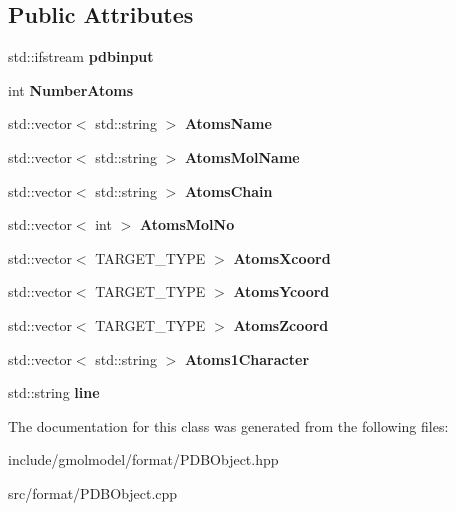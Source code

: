 \subsection*{Public Attributes}
\begin{DoxyCompactItemize}
\item 
std\+::ifstream {\bfseries pdbinput}\hypertarget{classPDBObject_ab08b53055c06295722ccf4fbc6285140}{}\label{classPDBObject_ab08b53055c06295722ccf4fbc6285140}

\item 
int {\bfseries Number\+Atoms}\hypertarget{classPDBObject_a4f3b486261366a7f54388a5ae49ddb29}{}\label{classPDBObject_a4f3b486261366a7f54388a5ae49ddb29}

\item 
std\+::vector$<$ std\+::string $>$ {\bfseries Atoms\+Name}\hypertarget{classPDBObject_af47560730130db2c9283bab146e5bc14}{}\label{classPDBObject_af47560730130db2c9283bab146e5bc14}

\item 
std\+::vector$<$ std\+::string $>$ {\bfseries Atoms\+Mol\+Name}\hypertarget{classPDBObject_ad5e1ed3a98c12156706b338068f675fb}{}\label{classPDBObject_ad5e1ed3a98c12156706b338068f675fb}

\item 
std\+::vector$<$ std\+::string $>$ {\bfseries Atoms\+Chain}\hypertarget{classPDBObject_a757696155e3ca58aefe5e2e2d38f987a}{}\label{classPDBObject_a757696155e3ca58aefe5e2e2d38f987a}

\item 
std\+::vector$<$ int $>$ {\bfseries Atoms\+Mol\+No}\hypertarget{classPDBObject_af623e48e95e436dfcb982dc080392a93}{}\label{classPDBObject_af623e48e95e436dfcb982dc080392a93}

\item 
std\+::vector$<$ T\+A\+R\+G\+E\+T\+\_\+\+T\+Y\+PE $>$ {\bfseries Atoms\+Xcoord}\hypertarget{classPDBObject_ad47eadab1602ab01f6f6a71af500e08b}{}\label{classPDBObject_ad47eadab1602ab01f6f6a71af500e08b}

\item 
std\+::vector$<$ T\+A\+R\+G\+E\+T\+\_\+\+T\+Y\+PE $>$ {\bfseries Atoms\+Ycoord}\hypertarget{classPDBObject_a51d4184d7af75bf752cbd7718eb8c5e0}{}\label{classPDBObject_a51d4184d7af75bf752cbd7718eb8c5e0}

\item 
std\+::vector$<$ T\+A\+R\+G\+E\+T\+\_\+\+T\+Y\+PE $>$ {\bfseries Atoms\+Zcoord}\hypertarget{classPDBObject_a1d8f152f2633d0d1d9fa8841b718d803}{}\label{classPDBObject_a1d8f152f2633d0d1d9fa8841b718d803}

\item 
std\+::vector$<$ std\+::string $>$ {\bfseries Atoms1\+Character}\hypertarget{classPDBObject_ae528fc6e1419377be5165d386e1cc270}{}\label{classPDBObject_ae528fc6e1419377be5165d386e1cc270}

\item 
std\+::string {\bfseries line}\hypertarget{classPDBObject_ab8ddb8c0e5268ec03b838a132e8211dd}{}\label{classPDBObject_ab8ddb8c0e5268ec03b838a132e8211dd}

\end{DoxyCompactItemize}


The documentation for this class was generated from the following files\+:\begin{DoxyCompactItemize}
\item 
include/gmolmodel/format/P\+D\+B\+Object.\+hpp\item 
src/format/P\+D\+B\+Object.\+cpp\end{DoxyCompactItemize}
